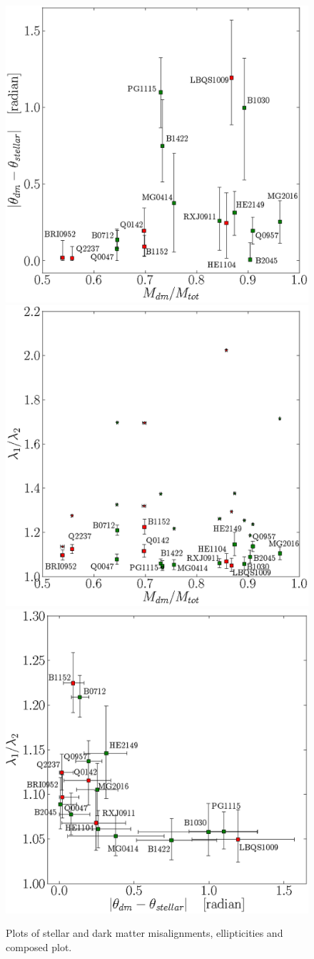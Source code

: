 \documentclass[useAMS,usenatbib]{mn2e}
\begin{document}
\begin{figure}
 \begin{center}
 \includegraphics[height=0.49\textwidth]{Figures/b.eps}
 \includegraphics[height=0.49\textwidth]{Figures/d.eps}
 \includegraphics[height=0.49\textwidth]{Figures/e.eps}\\
 \caption{Plots of stellar and dark matter misalignments, ellipticities and composed plot.}
 \label{fig:moneyplots}
 \end{center}
\end{figure}
\end{document}
